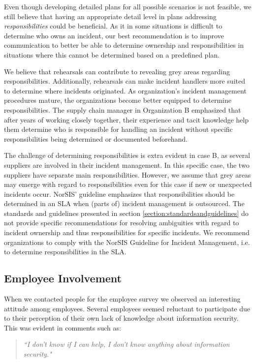 Even though developing detailed plans for all possible scenarios is not feasible, we still believe that having an appropriate detail level in plans addressing \textit{responsibilities} could be beneficial. As it in some situations is difficult to determine who owns an incident, our best recommendation is to improve communication to better be able to determine ownership and responsibilities in situations where this cannot be determined based on a predefined plan.

We believe that rehearsals can contribute to revealing grey areas regarding responsibilities. Additionally, rehearsals can make incident handlers more suited to determine where incidents originated. As organization's incident management procedures mature, the organizations become better equipped to determine responsibilities. The supply chain manager in Organization B emphasized that after years of working closely together, their experience and tacit knowledge help them determine who is responsible for handling an incident without specific responsibilities being determined or documented beforehand. 

The challenge of determining responsibilities is extra evident in case B, as several suppliers are involved in their incident management. In this specific case, the two suppliers have separate main responsibilities. However, we assume that grey areas may emerge with regard to responsibilities even for this case if new or unexpected incidents occur. NorSIS' guideline emphasizes that responsibilities should be determined in an SLA when (parts of) incident management is outsourced. The standards and guidelines presented in section \ref{section:standardsandguidelines} do not provide specific recommendations for resolving ambiguities with regard to incident ownership and thus responsibilities for specific incidents. We recommend organizations to comply with the NorSIS Guideline for Incident Management, i.e. to determine responsibilities in the \ac{SLA}.


\subsection{Employee Involvement}
When we contacted people for the employee survey we observed an interesting attitude among employees. Several employees seemed reluctant to participate due to their perception of their own lack of knowledge about information security. This was evident in comments such as:

\begin{quote}
\textit{``I don't know if I can help, I don't know anything about information security."}
\end{quote}

